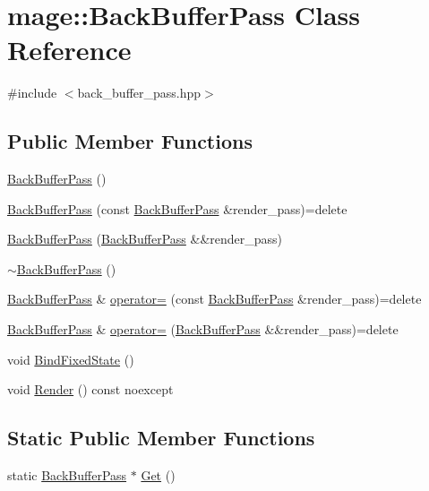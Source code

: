 \hypertarget{classmage_1_1_back_buffer_pass}{}\section{mage\+:\+:Back\+Buffer\+Pass Class Reference}
\label{classmage_1_1_back_buffer_pass}


{\ttfamily \#include $<$back\+\_\+buffer\+\_\+pass.\+hpp$>$}

\subsection*{Public Member Functions}
\begin{DoxyCompactItemize}
\item 
\hyperlink{classmage_1_1_back_buffer_pass_a46ce63d05208fc3dea43244713a6a280}{Back\+Buffer\+Pass} ()
\item 
\hyperlink{classmage_1_1_back_buffer_pass_af69d8bb752a4e35d57ebd5afedaa097d}{Back\+Buffer\+Pass} (const \hyperlink{classmage_1_1_back_buffer_pass}{Back\+Buffer\+Pass} \&render\+\_\+pass)=delete
\item 
\hyperlink{classmage_1_1_back_buffer_pass_ad34af02ed3afeee917c3dd60f45d5493}{Back\+Buffer\+Pass} (\hyperlink{classmage_1_1_back_buffer_pass}{Back\+Buffer\+Pass} \&\&render\+\_\+pass)
\item 
\hyperlink{classmage_1_1_back_buffer_pass_a10ccd92ff4480261e9ecfc435f5d9ed3}{$\sim$\+Back\+Buffer\+Pass} ()
\item 
\hyperlink{classmage_1_1_back_buffer_pass}{Back\+Buffer\+Pass} \& \hyperlink{classmage_1_1_back_buffer_pass_a6d1fb713b11b30a08f6d811b5e1fe29b}{operator=} (const \hyperlink{classmage_1_1_back_buffer_pass}{Back\+Buffer\+Pass} \&render\+\_\+pass)=delete
\item 
\hyperlink{classmage_1_1_back_buffer_pass}{Back\+Buffer\+Pass} \& \hyperlink{classmage_1_1_back_buffer_pass_a63adba9a29335c03c30842de8836302a}{operator=} (\hyperlink{classmage_1_1_back_buffer_pass}{Back\+Buffer\+Pass} \&\&render\+\_\+pass)=delete
\item 
void \hyperlink{classmage_1_1_back_buffer_pass_a86dd8df1ac3fac070d1373dad045c975}{Bind\+Fixed\+State} ()
\item 
void \hyperlink{classmage_1_1_back_buffer_pass_a6f0265c182a4b1ac2badd5df3fb11545}{Render} () const noexcept
\end{DoxyCompactItemize}
\subsection*{Static Public Member Functions}
\begin{DoxyCompactItemize}
\item 
static \hyperlink{classmage_1_1_back_buffer_pass}{Back\+Buffer\+Pass} $\ast$ \hyperlink{classmage_1_1_back_buffer_pass_ae925b441c80f2aa711fbba6d782e5f81}{Get} ()
\end{DoxyCompactItemize}
